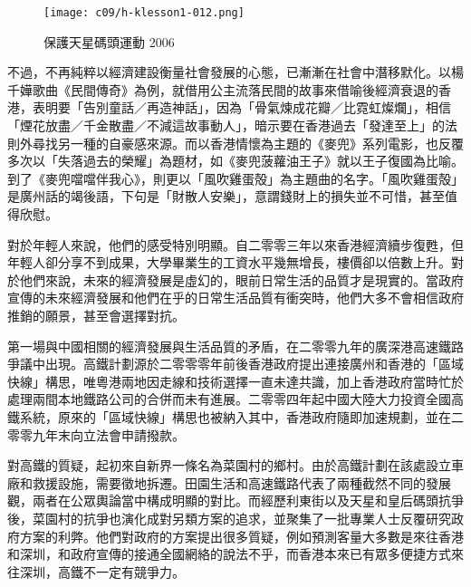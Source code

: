 \begin{figure}[htbp]
    \centering
    \texttt{[image: c09/h-klesson1-012.png]}
    \caption{保護天星碼頭運動 2006} 
\end{figure}

不過，不再純粹以經濟建設衡量社會發展的心態，已漸漸在社會中潛移默化。以楊千嬅歌曲《民間傳奇》為例，就借用公主流落民間的故事來借喻後經濟衰退的香港，表明要「告別童話／再造神話」，因為「骨氣煉成花瓣／比霓虹燦爛」，相信「煙花放盡／千金散盡／不減這故事動人」，暗示要在香港過去「發達至上」的法則外尋找另一種的自豪感來源。而以香港情懷為主題的《麥兜》系列電影，也反覆多次以「失落過去的榮耀」為題材，如《麥兜菠蘿油王子》就以王子復國為比喻。到了《麥兜噹噹伴我心》，則更以「風吹雞蛋殻」為主題曲的名字。「風吹雞蛋殻」是廣州話的竭後語，下句是「財散人安樂」，意謂錢財上的損失並不可惜，甚至值得欣慰。


對於年輕人來說，他們的感受特別明顯。自二零零三年以來香港經濟續步復甦，但年輕人卻分享不到成果，大學畢業生的工資水平幾無增長，樓價卻以倍數上升。對於他們來說，未來的經濟發展是虛幻的，眼前日常生活的品質才是現實的。當政府宣傳的未來經濟發展和他們在乎的日常生活品質有衝突時，他們大多不會相信政府推銷的願景，甚至會選擇對抗。

第一場與中國相關的經濟發展與生活品質的矛盾，在二零零九年的廣深港高速鐵路爭議中出現。高鐵計劃源於二零零零年前後香港政府提出連接廣州和香港的「區域快線」構思，唯粵港兩地因走線和技術選擇一直未達共識，加上香港政府當時忙於處理兩間本地鐵路公司的合併而未有進展。二零零四年起中國大陸大力投資全國高鐵系統，原來的「區域快線」構思也被納入其中，香港政府隨即加速規劃，並在二零零九年末向立法會申請撥款。

對高鐵的質疑，起初來自新界一條名為菜園村的鄉村。由於高鐵計劃在該處設立車廠和救援設施，需要徵地拆遷。田園生活和高速鐵路代表了兩種截然不同的發展觀，兩者在公眾輿論當中構成明顯的對比。而經歷利東街以及天星和皇后碼頭抗爭後，菜園村的抗爭也演化成對另類方案的追求，並聚集了一批專業人士反覆研究政府方案的利弊。他們對政府的方案提出很多質疑，例如預測客量大多數是來往香港和深圳，和政府宣傳的接通全國網絡的說法不乎，而香港本來已有眾多便捷方式來往深圳，高鐵不一定有競爭力。


